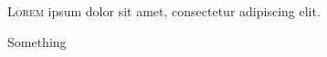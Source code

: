 
\lettrine[nindent=0em,lines=3]{L}{orem} ipsum dolor sit amet, consectetur adipiscing elit.
\blindtext
  
\blindtext
Something